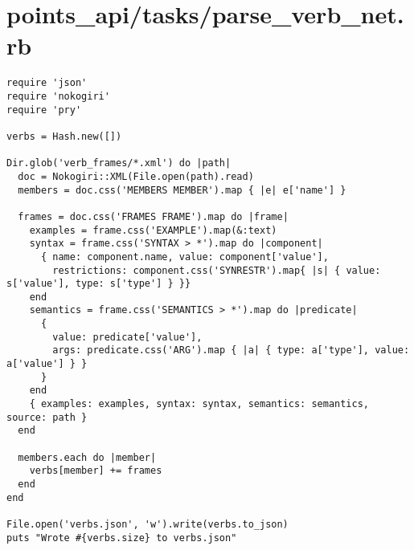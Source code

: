 \documentclass{article}
\begin{document}
\section*{points\_api/tasks/parse\_verb\_net.rb}
\begin{verbatim}
require 'json'
require 'nokogiri'
require 'pry'

verbs = Hash.new([])

Dir.glob('verb_frames/*.xml') do |path|
  doc = Nokogiri::XML(File.open(path).read)
  members = doc.css('MEMBERS MEMBER').map { |e| e['name'] }

  frames = doc.css('FRAMES FRAME').map do |frame|
    examples = frame.css('EXAMPLE').map(&:text)
    syntax = frame.css('SYNTAX > *').map do |component|
      { name: component.name, value: component['value'],
        restrictions: component.css('SYNRESTR').map{ |s| { value: s['value'], type: s['type'] } }}
    end
    semantics = frame.css('SEMANTICS > *').map do |predicate|
      {
        value: predicate['value'],
        args: predicate.css('ARG').map { |a| { type: a['type'], value: a['value'] } }
      }
    end
    { examples: examples, syntax: syntax, semantics: semantics, source: path }
  end

  members.each do |member|
    verbs[member] += frames
  end
end

File.open('verbs.json', 'w').write(verbs.to_json)
puts "Wrote #{verbs.size} to verbs.json"


\end{verbatim}
\pagebreak
\end{document}
